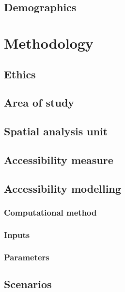 \documentclass[12pt, a4paper]{report}
\begin{document}
\section{Demographics}




\chapter{Methodology} \label{Chap4}

\section{Ethics}

\section{Area of study}

\section{Spatial analysis unit}

\section{Accessibility measure}

\section{Accessibility modelling}

\subsection{Computational method}

\subsection{Inputs}

\subsection{Parameters}






\section{Scenarios}
\end{document}
